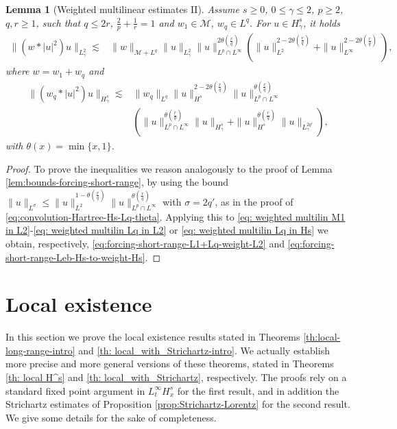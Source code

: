 \documentclass[12pt]{article}
\theoremstyle{plain}
\newtheorem{lemma}[theo]{Lemma}
\newcommand{\meas}{\mathcal{M}}
\begin{document}
\begin{lemma}[Weighted multilinear estimates II]
\label{lemma: weight multilin 2}
Assume $s\ge 0$, $0 \leq \gamma \leq 2$, $p\geq2$, $q,r \ge 1$, such that $q\leq 2r$, $\frac{2}{p}+\frac{1}{r}=1$
and $w_{1}\in\meas$, $w_{q}\in L^{q}$. For $u\in H^s_\gamma$, it holds
\begin{align}
\|(w*|u|^2)u \|_{L^2_\gamma} \lesssim & \|w\|_{\meas + L^q} \|u\|_{L^2_\gamma} \|u\|_{L^p\cap L^\infty}^{2\theta (\frac{r}{q})} (\|u\|_{L^2}^{2-2\theta (\frac{r}{q})} + \|u\|_{L^\infty}^{2-2\theta (\frac{r}{q})}), \label{eq:forcing-short-range-L1+Lq-weight-L2}
\end{align}
where $w = w_1 + w_q$ and 
\begin{align}
  \|  (w_q*|u|^2)u \|_{H^s_\gamma}\lesssim & \|w_q\|_{L^q} \|u\|_{H^s}^{2-2\theta (\frac{r}{q})} \|u\|_{L^p\cap L^\infty}^{\theta (\frac{r}{q})}\nonumber\\
  &( \|u\|_{L^p\cap L^\infty}^{\theta (\frac{r}{q})} \|u\|_{H^s_\gamma} + \|u\|_{H^s}^{\theta (\frac{r}{q})} \|u\|_{L^{2q'}_\gamma}), \label{eq:forcing-short-range-Leb-Hs-to-weight-Hs}
\end{align}
with $\theta(x)=\min\{x,1\}$. 
\end{lemma}


\begin{proof}
  To prove the inequalities we reason analogously to the proof of Lemma \ref{lem:bounds-forcing-short-range}, by using the bound $\|u\|_{L^\sigma}\leq \|u\|_{L^2}^{1-\theta (\frac{r}{q})} \|u\|_{L^p\cap L^\infty}^{\theta (\frac{r}{q})}$ with $\sigma = 2q'$, as in the proof of \eqref{eq:convolution-Hartree-Hs-Lq-theta}. Applying this to \eqref{eq: weighted multilin M1 in L2}-\eqref{eq: weighted multilin Lq in L2} or \eqref{eq: weighted multilin Lq in Hs} we obtain, respectively,  \eqref{eq:forcing-short-range-L1+Lq-weight-L2} and \eqref{eq:forcing-short-range-Leb-Hs-to-weight-Hs}. 
\end{proof}



	\section{Local existence}\label{sec:local}
	
	In this section we prove the local existence results stated in Theorems \ref{th:local-long-range-intro} and \ref{th: local_with_Strichartz-intro}. We actually establish more precise and more general versions of these theorems, stated in Theorems \ref{th: local H^s} and \ref{th: local_with_Strichartz}, respectively. The proofs rely on a standard fixed point argument in $L^\infty_tH^s_x$ for the first result, and in addition the Strichartz estimates of Proposition \ref{prop:Strichartz-Lorentz} for the second result. We give some details for the sake of completeness. 
	
\end{document}
